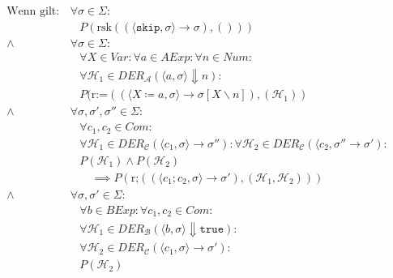 \documentclass[a4paper, 11pt, accentcolor = tud3b]{tudreport}
\begin{document}
					    \begin{align*}
						    \text{Wenn gilt:} & \,\forall \sigma \in \Sigma : \tag{Zustände} \\
							    &\quad P(\text{rsk}((\langle \texttt{skip}, \sigma \rangle \rightarrow \sigma), ())) \tag{Konklusion} \\
							\land & \,\forall \sigma \in \Sigma : \tag{Zustände} \\
								&\quad \forall X \in \textit{Var} : \forall a \in \textit{AExp} : \forall n \in \textit{Num} : \tag{Ausdrucksbestandteile} \\
								&\quad \forall \mathcal{H} _ 1 \in \textit{DER} _ \mathcal{A} (\langle a, \sigma \rangle \Downarrow n) : \tag{Kalkülfremde Herleitungen} \\
								&\quad P(\text{r:=}((\langle X \coloneqq a, \sigma \rangle \rightarrow \sigma[X \backslash n]), (\mathcal{H} _ 1)) \tag{Konklusion} \\
							\land & \,\forall \sigma, \sigma', \sigma'' \in \Sigma : \tag{Zustände} \\
								&\quad \forall c _ 1, c _ 2 \in \textit{Com} : \tag{Ausdrucksbestandteile} \\
								&\quad \forall \mathcal{H} _ 1 \in \textit{DER} _ \mathcal{C} (\langle c _ 1, \sigma \rangle \rightarrow \sigma'') : \forall \mathcal{H} _ 2 \in \textit{DER} _ \mathcal{C} (\langle c _ 2, \sigma'' \rightarrow \sigma') : \tag{Herleitungen in Prämisse} \\
								&\quad P(\mathcal{H} _ 1) \land P(\mathcal{H} _ 2) \tag{Prämisse} \\
								&\quad\quad \implies P(\text{r;}((\langle c _ 1 ; c _ 2, \sigma \rangle \rightarrow \sigma'), (\mathcal{H} _ 1, \mathcal{H} _ 2))) \tag{Konklusion} \\
							\land & \,\forall \sigma, \sigma' \in \Sigma : \tag{Zustände} \\
								&\quad \forall b \in \textit{BExp} : \forall c _ 1, c _ 2 \in \textit{Com} : \tag{Ausdrucksbestandteile} \\
								&\quad \forall \mathcal{H} _ 1 \in \textit{DER} _ \mathcal{B} (\langle b, \sigma \rangle \Downarrow \texttt{true}) : \tag{Kalkülfremde Herleitungen} \\
								&\quad \forall \mathcal{H} _ 2 \in \textit{DER} _ \mathcal{C} (\langle c _ 1, \sigma \rangle \rightarrow \sigma') : \tag{Herleitungen in Prämisse} \\
								&\quad P(\mathcal{H} _ 2) \tag{Prämisse} \\

\end{align*}
\end{document}
